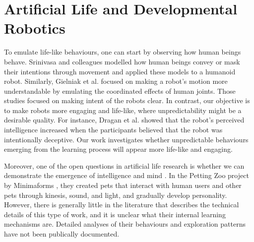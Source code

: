 
\section{Artificial Life and Developmental Robotics}

To emulate life-like behaviours, one can start by observing how human beings behave. Srinivasa and colleagues \cite{Dragan2015}\cite{AncaDraga2014} modelled how human beings convey or mask their intentions through movement and applied these models to a humanoid robot. Similarly, Gielniak et al. \cite{Gielniak2013} focused on making a robot's motion more understandable by emulating the coordinated effects of human joints. Those studies focused on making intent of the robots clear. In contrast, our objective is to make robots more engaging and life-like, where unpredictability might be a desirable quality. For instance, Dragan et al. \cite{AncaDraga2014} showed that the robot's perceived intelligence increased when the participants believed that the robot was intentionally deceptive. Our work investigates whether unpredictable behaviours emerging from the learning process will appear more life-like and engaging.


Moreover, one of the open questions in artificial life research is whether we can demonstrate the emergence of intelligence and mind \cite{Bedau2000}. In the Petting Zoo project by Minimaforms \cite{Minimaforms}, they created pets that interact with human users and other pets through kinesis, sound, and light, and gradually develop personality. However, there is generally little in the literature that describes the technical details of this type of work, and it is unclear what their internal learning mechanisms are. Detailed analyses of their behaviours and exploration patterns have not been publically documented. 

